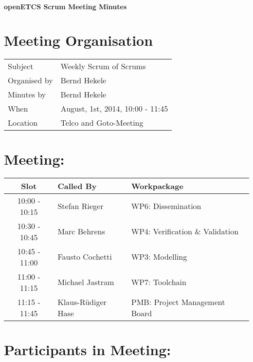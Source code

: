 \documentclass[a4paper, 11pt]{article}
\begin{document}
{\begin{center}\huge\bf openETCS Scrum Meeting Minutes\end{center}}
\section{Meeting Organisation}

\renewcommand{\arraystretch}{1.5}
\begin{supertabular}{m{.2\textwidth}m{.8\textwidth}}
Subject & Weekly Scrum of Scrums\\
Organised by & Bernd Hekele\\
Minutes by & Bernd Hekele\\
When & August, 1st, 2014, 10:00 - 11:45\\
Location & Telco and Goto-Meeting\\
\end{supertabular}

\renewcommand{\arraystretch}{1.0}
\section{Meeting:}

\begin{tabular}{|c|l|l|}
\hline
\textbf{Slot} &  \textbf{Called By} & \textbf{Workpackage} \\
\hline  
10:00 - 10:15 & Stefan Rieger & WP6: Dissemination \\\hline  
10:30 - 10:45 & Marc Behrens & WP4: Verification \& Validation \\\hline  
10:45 - 11:00 & Fausto Cochetti & WP3: Modelling \\\hline  
11:00 - 11:15 & Michael Jastram & WP7: Toolchain \\\hline
11:15 - 11:45 & Klaus-R\"udiger Hase & PMB: Project Management Board \\\hline  
\end{tabular}

\section{Participants in Meeting:}
\end{document}
